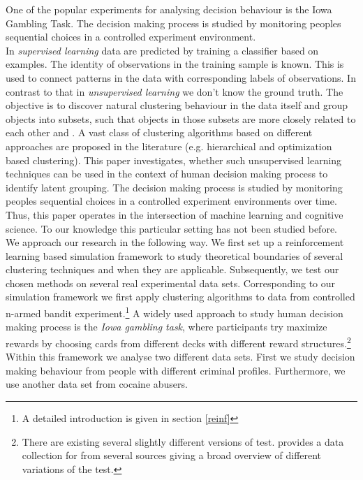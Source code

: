 \documentclass[12pt,a4paper,bibliography=totocnumbered,listof=totocnumbered]{scrartcl}
\begin{document}
One of the popular experiments for analysing decision behaviour is the Iowa Gambling Task. The decision making process is studied by monitoring peoples sequential choices in a controlled experiment environment.\\

In \textit{supervised learning} data are predicted by training a classifier based on examples. The identity of observations in the training sample is known. This is used to connect patterns in the data with corresponding labels of observations. In contrast to that in \textit{unsupervised learning} we don't know the ground truth. The objective is to discover natural clustering behaviour in the data itself and group objects into subsets, such that objects in those subsets are more closely related to each other \cite[page 9 et. seqq.]{Murphy2012} and \cite[page 501 et. seqq.]{hastie}. A vast class of clustering algorithms based on different approaches are proposed in the literature (e.g. hierarchical and optimization based clustering). This paper investigates, whether such unsupervised learning techniques can be used in the context of human decision making process to identify latent grouping. The decision making process is studied by monitoring peoples sequential choices in a controlled experiment environments over time. Thus, this paper operates in the intersection of machine learning and cognitive science. To our knowledge this particular setting has not been studied before.\\
We approach our research in the following way. We first set up a reinforcement learning based simulation framework to study theoretical boundaries of several clustering techniques and when they are applicable.
 Subsequently, we test our chosen methods on several  real experimental data sets. Corresponding to our simulation framework we first apply clustering algorithms to data from controlled n-armed bandit experiment.\footnote{A detailed introduction is given in section \ref{reinf}} A widely used approach to study human decision making process is the \textit{Iowa gambling task}, where participants try maximize rewards by choosing cards from different decks with different reward structures.\footnote{There are existing several slightly different versions of test. \cite{Steingroever2015} provides a data collection for from several sources giving a broad overview of different variations of the test.} Within this framework we analyse two different data sets. First we study decision making behaviour from people with different criminal profiles. Furthermore, we use another data set from cocaine abusers.\\
\end{document}
